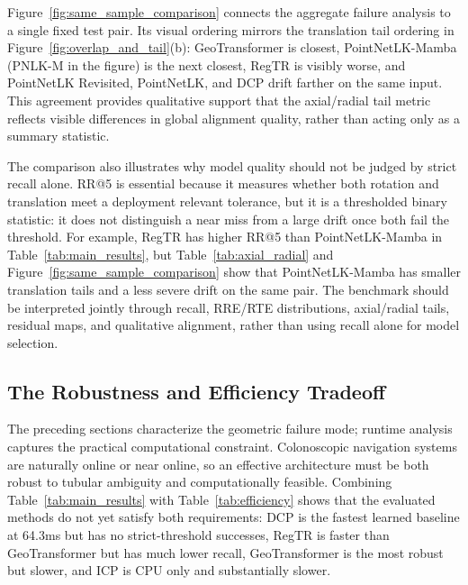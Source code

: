 \documentclass{bmvc2k}
\begin{document}
Figure~\ref{fig:same_sample_comparison} connects the aggregate failure analysis to a single fixed test pair. Its visual ordering mirrors the translation tail ordering in Figure~\ref{fig:overlap_and_tail}(b): GeoTransformer is closest, PointNetLK-Mamba (PNLK-M in the figure) is the next closest, RegTR is visibly worse, and PointNetLK Revisited, PointNetLK, and DCP drift farther on the same input. This agreement provides qualitative support that the axial/radial tail metric reflects visible differences in global alignment quality, rather than acting only as a summary statistic.

The comparison also illustrates why model quality should not be judged by strict recall alone. RR@5 is essential because it measures whether both rotation and translation meet a deployment relevant tolerance, but it is a thresholded binary statistic: it does not distinguish a near miss from a large drift once both fail the threshold. For example, RegTR has higher RR@5 than PointNetLK-Mamba in Table~\ref{tab:main_results}, but Table~\ref{tab:axial_radial} and Figure~\ref{fig:same_sample_comparison} show that PointNetLK-Mamba has smaller translation tails and a less severe drift on the same pair. The benchmark should be interpreted jointly through recall, RRE/RTE distributions, axial/radial tails, residual maps, and qualitative alignment, rather than using recall alone for model selection.

\subsection{The Robustness and Efficiency Tradeoff}
\label{sec:efficiency}

The preceding sections characterize the geometric failure mode; runtime analysis captures the practical computational constraint. Colonoscopic navigation systems are naturally online or near online, so an effective architecture must be both robust to tubular ambiguity and computationally feasible. Combining Table~\ref{tab:main_results} with Table~\ref{tab:efficiency} shows that the evaluated methods do not yet satisfy both requirements: DCP is the fastest learned baseline at 64.3ms but has no strict-threshold successes, RegTR is faster than GeoTransformer but has much lower recall, GeoTransformer is the most robust but slower, and ICP is CPU only and substantially slower.
\end{document}
